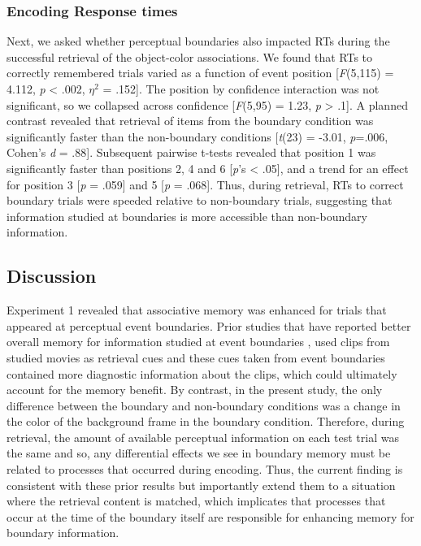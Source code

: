 \subsubsection{Encoding Response times}\label{encoding-response-times}

Next, we asked whether perceptual boundaries also impacted RTs during
the successful retrieval of the object-color associations. We found that
RTs to correctly remembered trials varied as a function of event
position {[}\emph{F}(5,115) = 4.112, \emph{p} \textless{} .002,
\(\eta^{2}\) = .152{]}. The position by confidence interaction was not
significant, so we collapsed across confidence {[}\emph{F}(5,95) = 1.23,
\emph{p} \textgreater{} .1{]}. A planned contrast revealed that
retrieval of items from the boundary condition was significantly faster
than the non-boundary conditions {[}\emph{t}(23) = -3.01, \emph{p}=.006,
Cohen's \emph{d} = .88{]}. Subsequent pairwise t-tests revealed that
position 1 was significantly faster than positions 2, 4 and 6
{[}\emph{p}'s \textless{} .05{]}, and a trend for an effect for position
3 {[}\emph{p} = .059{]} and 5 {[}\emph{p} = .068{]}. Thus, during
retrieval, RTs to correct boundary trials were speeded relative to
non-boundary trials, suggesting that information studied at boundaries
is more accessible than non-boundary information.

\subsection{Discussion}\label{discussion}

Experiment 1 revealed that associative memory was enhanced for trials
that appeared at perceptual event boundaries. Prior studies that have
reported better overall memory for information studied at event
boundaries
\autocites{boltz_temporal_1992}{newtson_perceptual_1976}{schwan_cognitive_2004},
used clips from studied movies as retrieval cues and these cues taken
from event boundaries contained more diagnostic information about the
clips, which could ultimately account for the memory benefit. By
contrast, in the present study, the only difference between the boundary
and non-boundary conditions was a change in the color of the background
frame in the boundary condition. Therefore, during retrieval, the amount
of available perceptual information on each test trial was the same and
so, any differential effects we see in boundary memory must be related
to processes that occurred during encoding. Thus, the current finding is
consistent with these prior results but importantly extend them to a
situation where the retrieval content is matched, which implicates that
processes that occur at the time of the boundary itself are responsible
for enhancing memory for boundary information.

